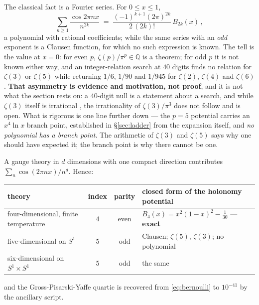 \documentclass[11pt,a4paper]{article}
\begin{document}
The classical fact is a Fourier series. For $0\le x\le 1$,
\begin{equation}\label{eq:bernoulli}
  \sum_{n\ge1}\frac{\cos 2\pi n x}{n^{2k}}
   \;=\;\frac{(-1)^{k+1}(2\pi)^{2k}}{2\,(2k)!}\,B_{2k}(x)\,,
\end{equation}
a polynomial with rational coefficients; while the same series with an \emph{odd} exponent is a
Clausen function, for which no such expression is known. The tell is the value at $x=0$: for even
$p$, $\zeta(p)/\pi^p\in\mathbb{Q}$ is a theorem; for odd $p$ it is not known either way, and an
integer-relation search at $40$ digits finds no relation for $\zeta(3)$ or $\zeta(5)$ while
returning $1/6$, $1/90$ and $1/945$ for $\zeta(2)$, $\zeta(4)$ and $\zeta(6)$. \textbf{That
asymmetry is evidence and motivation, not proof}, and it is not what the section rests on: a
$40$-digit null is a statement about a search, and while $\zeta(3)$ itself is irrational
\cite{Apery}, the irrationality of $\zeta(3)/\pi^3$ does not follow and is open.
What is rigorous is one line further down --- the $p=5$ potential carries an $x^4\ln x$ branch
point, established in \S\ref{sec:ladder} from the expansion itself, and \emph{no polynomial has a
branch point}. The arithmetic of $\zeta(3)$ and $\zeta(5)$ says why one should have expected it;
the branch point is why there cannot be one.

A gauge theory in $d$ dimensions with one compact direction contributes
$\sum_n \cos(2\pi n x)/n^{d}$. Hence:

\begin{center}\small
{}
\begin{tabular}{lccl}
\toprule
\rowcolor{hdrblue!10}theory & index & parity & closed form of the holonomy potential\\
\midrule
\rowcolor{okgreen!12}four-dimensional, finite temperature & $4$ & even & $B_4(x)=x^2(1-x)^2-\tfrac1{30}$ --- \textbf{exact}\\
\rowcolor{amber!12}five-dimensional on $S^1$ \cite{vGIQ,HY04} & $5$ & odd & Clausen; $\zeta(5)$, $\zeta(3)$; no polynomial\\
\rowcolor{amber!12}six-dimensional on $S^1\times S^1$ \cite{KM25} & $5$ & odd & the same\\
\bottomrule
\end{tabular}
\end{center}

\noindent and the Gross-Pisarski-Yaffe quartic is recovered from \eqref{eq:bernoulli} to $10^{-41}$
by the ancillary script.
\end{document}
